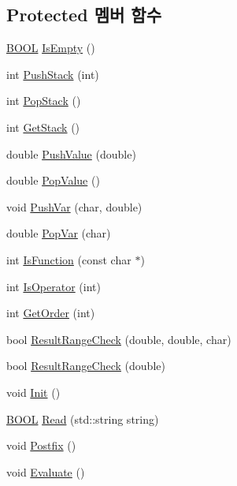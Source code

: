 \subsection*{Protected 멤버 함수}
\begin{DoxyCompactItemize}
\item 
\hyperlink{_calculate_8h_a3e5b8192e7d9ffaf3542f1210aec18dd}{B\+O\+O\+L} \hyperlink{class_calculate_a689df9c34a1e9f4bb55a8487a9761380}{Is\+Empty} ()
\item 
int \hyperlink{class_calculate_a4981fb0c9805e7cc7418c4c8089be189}{Push\+Stack} (int)
\item 
int \hyperlink{class_calculate_a2ca7f9e37fc39bc7230fac0bdda0fc87}{Pop\+Stack} ()
\item 
int \hyperlink{class_calculate_a51b9a5aa2196ff202ebd8c7414f1f830}{Get\+Stack} ()
\item 
double \hyperlink{class_calculate_a25e1df1079c2b915fc3c755406f44948}{Push\+Value} (double)
\item 
double \hyperlink{class_calculate_a1a970f9eaf0ce1296acf354fb1eee7f6}{Pop\+Value} ()
\item 
void \hyperlink{class_calculate_a0031446d6885f82dd36f45665d5c5ac1}{Push\+Var} (char, double)
\item 
double \hyperlink{class_calculate_a0e154ef32a3b779b31af1a2724c92b95}{Pop\+Var} (char)
\item 
int \hyperlink{class_calculate_a753ebfbfca50f0421eae09729794fbf1}{Is\+Function} (const char $\ast$)
\item 
int \hyperlink{class_calculate_a32f5599bfe127c4e90d356ff883c624b}{Is\+Operator} (int)
\item 
int \hyperlink{class_calculate_ab76e8ed2e961699a73807f9af6b72aa9}{Get\+Order} (int)
\item 
bool \hyperlink{class_calculate_a2a0f619344c8154e8740819942ccdddd}{Result\+Range\+Check} (double, double, char)
\item 
bool \hyperlink{class_calculate_ab9429972ea44b6d1e57f9bdf7f377e34}{Result\+Range\+Check} (double)
\item 
void \hyperlink{class_calculate_aa8f0261822a44685b37dfe22a6eacc04}{Init} ()
\item 
\hyperlink{_calculate_8h_a3e5b8192e7d9ffaf3542f1210aec18dd}{B\+O\+O\+L} \hyperlink{class_calculate_a680527f598a4b37febfcdeb21dea6e9c}{Read} (std\+::string string)
\item 
void \hyperlink{class_calculate_a81090066a9bc2e77432198e45850eb5d}{Postfix} ()
\item 
void \hyperlink{class_calculate_af81d8f0097a86c858825c3deef573697}{Evaluate} ()
\end{DoxyCompactItemize}

